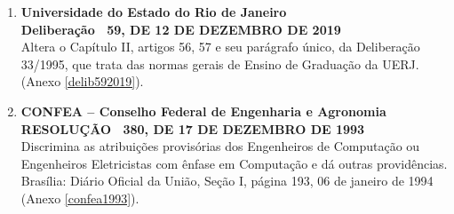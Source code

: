\begin{enumerate}
      \item \textbf{Universidade do Estado do Rio de Janeiro}  \\
            \textbf{Deliberação ~59, DE 12 DE DEZEMBRO DE 2019}  \\
            Altera o Capítulo II, artigos 56, 57 e seu parágrafo único, da Deliberação 33/1995, que trata das normas gerais de Ensino de Graduação da UERJ. (Anexo \ref{delib592019}).

      \item \textbf{CONFEA – Conselho Federal de Engenharia e Agronomia} \\
            \textbf{RESOLUÇÃO ~380, DE 17 DE DEZEMBRO DE 1993}  \\
            Discrimina as atribuições provisórias dos Engenheiros de Computação ou Engenheiros Eletricistas com ênfase em Computação e dá outras providências. Brasília: Diário Oficial da União, Seção I, página 193, 06 de janeiro de 1994 (Anexo \ref{confea1993}).
\end{enumerate}
